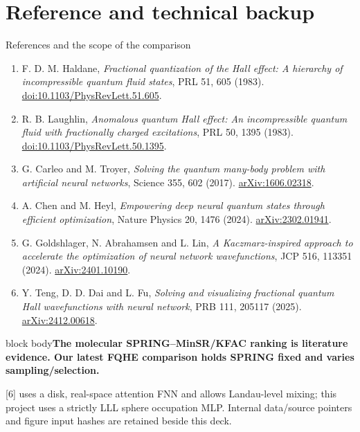 \documentclass[aspectratio=169,10pt]{beamer}
\newcommand{\src}[1]{\vfill{\fontsize{6.3}{7.5}\selectfont\color{muted}#1\par}}
\newcommand{\take}[1]{\vspace{1mm}\begin{beamercolorbox}[sep=1.6mm,wd=\textwidth]{block body}\small\color{teal}\textbf{#1}\end{beamercolorbox}}
\begin{document}
\section{Reference and technical backup}
\begin{frame}{References and the scope of the comparison}
\footnotesize
\begin{enumerate}\setlength\itemsep{5pt}
\item F. D. M. Haldane, \emph{Fractional quantization of the Hall effect: A hierarchy of incompressible quantum fluid states}, PRL 51, 605 (1983). \href{https://doi.org/10.1103/PhysRevLett.51.605}{doi:10.1103/PhysRevLett.51.605}.
\item R. B. Laughlin, \emph{Anomalous quantum Hall effect: An incompressible quantum fluid with fractionally charged excitations}, PRL 50, 1395 (1983). \href{https://doi.org/10.1103/PhysRevLett.50.1395}{doi:10.1103/PhysRevLett.50.1395}.
\item G. Carleo and M. Troyer, \emph{Solving the quantum many-body problem with artificial neural networks}, Science 355, 602 (2017). \href{https://arxiv.org/abs/1606.02318}{arXiv:1606.02318}.
\item A. Chen and M. Heyl, \emph{Empowering deep neural quantum states through efficient optimization}, Nature Physics 20, 1476 (2024). \href{https://arxiv.org/abs/2302.01941}{arXiv:2302.01941}.
\item G. Goldshlager, N. Abrahamsen and L. Lin, \emph{A Kaczmarz-inspired approach to accelerate the optimization of neural network wavefunctions}, JCP 516, 113351 (2024). \href{https://arxiv.org/abs/2401.10190}{arXiv:2401.10190}.
\item Y. Teng, D. D. Dai and L. Fu, \emph{Solving and visualizing fractional quantum Hall wavefunctions with neural network}, PRB 111, 205117 (2025). \href{https://arxiv.org/abs/2412.00618}{arXiv:2412.00618}.
\end{enumerate}
\take{The molecular SPRING--MinSR/KFAC ranking is literature evidence. Our latest FQHE comparison holds SPRING fixed and varies sampling/selection.}
\src{[6] uses a disk, real-space attention FNN and allows Landau-level mixing; this project uses a strictly LLL sphere occupation MLP. Internal data/source pointers and figure input hashes are retained beside this deck.}
\end{frame}
\end{document}
